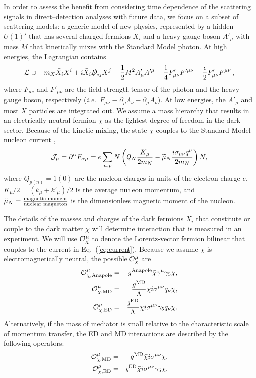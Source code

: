 \documentclass[11pt]{article}
\newcommand{\ie}{{\it i.e.~}}  \newcommand{\eg}{{\it e.g.~}}
\newcommand{\pL}{\left(} \newcommand{\pR}{\right)} \newcommand{\bL}{\left[} \newcommand{\bR}{\right]} \newcommand{\cbL}{\left\{} \newcommand{\cbR}{\right\}} \newcommand{\mL}{\left|} \newcommand{\mR}{\right|} \newcommand{\ER}{E_R}
\newcommand{\beq}{\begin{equation}} \newcommand{\eeq}{\end{equation}}
\newcommand{\Eq}[1]{Eq.~(\ref{#1})} \newcommand{\Eqs}[2]{Eqs.~(\ref{#1}) and (\ref{#2})} \newcommand{\Eqm}[2]{Eqs.~(\ref{#1}) through (\ref{#2})}
\begin{document}
In order to assess the benefit from considering time dependence of the scattering signals in direct--detection analyses with future data, we focus on a subset of scattering models: a generic model of new physics, represented by a hidden $U(1)'$ that has several charged fermions $X_i$ and a heavy gauge boson $A'_\mu$ with mass $M$ that kinetically mixes with the Standard Model photon. At high energies, the Lagrangian contains
\beq \label{eq:UV-model}
\cL \supset -  m_X \bar X_i X^i + i \bar X_i \slashed D_{ij} X^j  - \frac12 M^2 A'_\mu A'^\mu  - \frac14 F'_{\mu \nu} F'^{\mu \nu} - \frac\epsilon2 F'_{\mu \nu} F^{\mu \nu} \, ,
\eeq
where $F_{\mu \nu}$ and $F'_{\mu \nu}$ are the field strength tensor of the photon and the heavy gauge boson, respectively (\ie $F_{\mu \nu} \equiv \partial_\mu A_\nu - \partial_\mu A_\nu$). At low energies, the $A'_\mu$ and most $X$ particles are integrated out. We assume a mass hierarchy that results in an electrically neutral fermion $\chi$ as the lightest degree of freedom in the dark sector. Because of the kinetic mixing, the state $\chi$ couples to the Standard Model nucleon current \cite{Gresham:2014vja},
\beq \label{eq:current}
\cJ_\mu = \partial^\alpha F_{\alpha \mu} = e \sum_{n,p} \bar N \pL Q_N \frac{K_\mu}{2m_N} -\widetilde \mu_N \frac{i \sigma_{\mu \nu}q^\nu}{2m_N} \pR N,
\eeq 
where $Q_{p(n)}=1(0)$ are the nucleon charges in units of the electron charge $e$, $K_\mu/2 = (k_\mu + k'_\mu)/2$ is the average nucleon momentum, and $\tilde{\mu}_N = {\text{magnetic moment} \over \text{nuclear magneton}}$ is the dimensionless magnetic moment of the nucleon.

The details of the masses and charges of the dark fermions $X_i$ that constitute or couple to the dark matter $\chi$ will determine interaction that is measured in an experiment. We will use ${\cal O}_\chi^\mu$ to denote the Lorentz-vector fermion bilinear that couples to the current in \Eq{eq:current}. Because we assume $\chi$ is electromagnetically neutral, the possible ${\cal O}_\chi^\mu$ are \cite{Gresham:2014vja, Gluscevic:2015sqa}
\begin{eqnarray} \label{eq:photon-DM-ops}
{\cal O}_{\rm \chi, Anapole}^\mu & = & g^{\rm Anapole}\bar \chi \gamma^\mu \gamma_5 \chi, \\
{\cal O}_{\rm \chi, MD}^\mu & = & \frac{g^{\rm MD}}{\Lambda}\bar \chi i \sigma^{\mu \nu} q_\nu \chi ,\\
{\cal O}_{\rm \chi, ED}^\mu & = & \frac{g^{\rm ED}}{\Lambda} \bar \chi i \sigma^{\mu \nu} \gamma_5 q_\nu \chi.
\end{eqnarray}
Alternatively, if the mass of mediator is small relative to the characteristic scale of momentum transfer, the ED and MD interactions are described by the following operators:
\begin{eqnarray} \label{eq:photon-DM-ops}
{\cal O}_{\rm \chi, MD}^\mu & = & g^{\rm MD}\bar \chi i \sigma^{\mu \nu}  \chi ,\\
{\cal O}_{\rm \chi, ED}^\mu & = & g^{\rm ED} \bar \chi i \sigma^{\mu \nu} \gamma_5 \chi.
\end{eqnarray}
\end{document}
